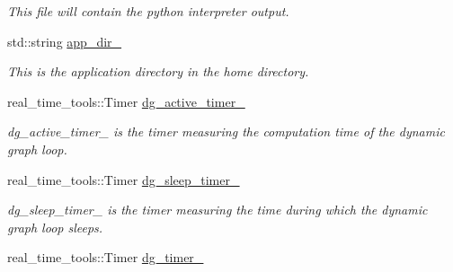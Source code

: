 \begin{DoxyCompactItemize}
\begin{DoxyCompactList}\small\item\em This file will contain the python interpreter output. \end{DoxyCompactList}\item 
std\+::string \hyperlink{classdynamic__graph_1_1DynamicGraphManager_a1f413dd58d270daf3c03f08d4a2c51cb}{app\+\_\+dir\+\_\+}\hypertarget{classdynamic__graph_1_1DynamicGraphManager_a1f413dd58d270daf3c03f08d4a2c51cb}{}\label{classdynamic__graph_1_1DynamicGraphManager_a1f413dd58d270daf3c03f08d4a2c51cb}

\begin{DoxyCompactList}\small\item\em This is the application directory in the home directory. \end{DoxyCompactList}\item 
real\+\_\+time\+\_\+tools\+::\+Timer \hyperlink{classdynamic__graph_1_1DynamicGraphManager_a8f206d87817177e389df0c27f1954f51}{dg\+\_\+active\+\_\+timer\+\_\+}\hypertarget{classdynamic__graph_1_1DynamicGraphManager_a8f206d87817177e389df0c27f1954f51}{}\label{classdynamic__graph_1_1DynamicGraphManager_a8f206d87817177e389df0c27f1954f51}

\begin{DoxyCompactList}\small\item\em dg\+\_\+active\+\_\+timer\+\_\+ is the timer measuring the computation time of the dynamic graph loop. \end{DoxyCompactList}\item 
real\+\_\+time\+\_\+tools\+::\+Timer \hyperlink{classdynamic__graph_1_1DynamicGraphManager_a8e0eb495ce07011796c58f54cef16ef5}{dg\+\_\+sleep\+\_\+timer\+\_\+}\hypertarget{classdynamic__graph_1_1DynamicGraphManager_a8e0eb495ce07011796c58f54cef16ef5}{}\label{classdynamic__graph_1_1DynamicGraphManager_a8e0eb495ce07011796c58f54cef16ef5}

\begin{DoxyCompactList}\small\item\em dg\+\_\+sleep\+\_\+timer\+\_\+ is the timer measuring the time during which the dynamic graph loop sleeps. \end{DoxyCompactList}\item 
real\+\_\+time\+\_\+tools\+::\+Timer \hyperlink{classdynamic__graph_1_1DynamicGraphManager_ae73984087ad28fe492905eda861783bd}{dg\+\_\+timer\+\_\+}\hypertarget{classdynamic__graph_1_1DynamicGraphManager_ae73984087ad28fe492905eda861783bd}{}\label{classdynamic__graph_1_1DynamicGraphManager_ae73984087ad28fe492905eda861783bd}


\end{DoxyCompactItemize}
